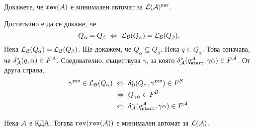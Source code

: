 \begin{problem}
  Докажете, че $\texttt{rev}(\mathcal{A})$ е минимален автомат за $\mathcal{L}(\mathcal{A})^{\texttt{rev}}$.
\end{problem}
\begin{hint}
  Достатъчно е да се докаже, че
  \[Q_\alpha = Q_\beta \ \Leftrightarrow\  \mathcal{L}_{\mathcal{B}}(Q_\alpha) = \mathcal{L}_{\mathcal{B}}(Q_\beta).\]
  Нека $\mathcal{L}_{\mathcal{B}}(Q_\alpha) = \mathcal{L}_{\mathcal{B}}(Q_\beta)$. Ще докажем, че $Q_\alpha \subseteq Q_\beta$.
  Нека $q \in Q_\alpha$. Това означава, че $\delta^\star_{\mathcal{A}}(q,\alpha) \in F^{\mathcal{A}}$.
  Следователно, съществува $\gamma$, за която $\delta^\star_{\mathcal{A}}(q_{\texttt{start}}^{\mathcal{A}},\gamma\alpha) \in F^{\mathcal{A}}$.
  От друга страна,
  \begin{align*}
    \gamma^{\texttt{rev}} \in \mathcal{L}_{\mathcal{B}}(Q_\alpha) & \ \Leftrightarrow\  \delta^\star_{\mathcal{B}}(Q_\alpha,\gamma^{\texttt{rev}}) \in F^{\mathcal{B}}\\
                                    & \ \Leftrightarrow\  Q_{\gamma\alpha} \in F^{\mathcal{B}}\\
                                    & \ \Leftrightarrow\  \delta^\star_{\mathcal{A}}(q_{\texttt{start}}^{\mathcal{A}},\gamma\alpha) \in F^{\mathcal{A}}.
  \end{align*}
\end{hint}


\begin{framed}
  \begin{theorem}[Бжозовски]
    Нека $\mathcal{A}$ е КДА. Тогава $\texttt{rev}(\texttt{rev}(\mathcal{A}))$ е минимален автомат за $\mathcal{L}(\mathcal{A})$.
  \end{theorem}
\end{framed}

